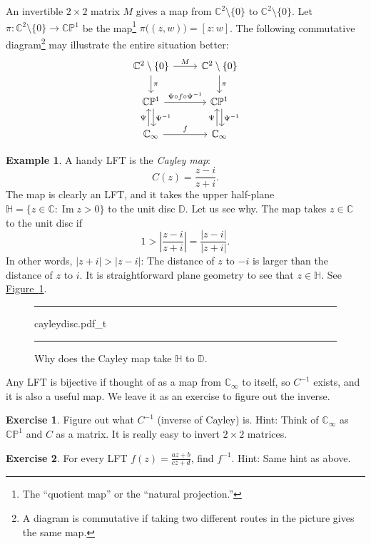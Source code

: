 \documentclass[12pt,openany]{book}
\renewcommand{\Im}{\operatorname{Im}}
\newcommand{\sabs}[1]{\lvert {#1} \rvert}
\newcommand{\abs}[1]{\left\lvert {#1} \right\rvert}
\newcommand{\C}{{\mathbb{C}}}
\newcommand{\D}{{\mathbb{D}}}
\newcommand{\bH}{{\mathbb{H}}}
\newcommand{\bP}{{\mathbb{P}}}
\newcommand{\myindex}[1]{#1\index{#1}}
\newcommand{\myquote}[1]{``#1''}
\theoremstyle{plain}
\theoremstyle{remark}
\theoremstyle{definition}
\newenvironment{exbox}{%
    \def\FrameCommand{\vrule width 1pt \relax\hspace{10pt}}%
    \MakeFramed{\advance\hsize-\width\FrameRestore}%
}{%
    \endMakeFramed
}
\newenvironment{myfig}{%
\begin{figure}[h!t]
\noindent\rule{\textwidth}{0.5pt}\vspace{12pt}\par\centering}%
{\par\noindent\rule{\textwidth}{0.5pt}
\end{figure}}
\theoremstyle{exercise}
\newtheorem{exercise}{Exercise}[section]
\theoremstyle{example}
\newtheorem{example}[thm]{Example}
\newcommand{\figureref}[1]{\hyperref[#1]{Figure~\ref*{#1}}}
\begin{document}
An invertible $2 \times 2$ matrix $M$ gives a map from
$\C^2 \setminus \{ 0 \}$ to $\C^2 \setminus \{ 0 \}$.
Let $\pi \colon \C^2 \setminus \{ 0 \} \to \C \bP^1$ be the map\footnote{The
\myquote{quotient map} or the \myquote{natural projection.}}
$\pi \bigl( (z,w) \bigr) =
[z:w]$.  The following commutative diagram\footnote{A diagram is
commutative if taking two different routes in the picture
gives the same map.}
may
illustrate the entire situation better:
\begin{equation*}
\begin{tikzcd}
\C^2 \setminus \{ 0 \} \arrow[r,"M"] \arrow[d,"\pi"] &
\C^2 \setminus \{ 0 \} \arrow[d,"\pi"] \\
\C \bP^1 \arrow[r,"\Psi \circ f \circ \Psi^{-1}"] \arrow[d,shift left,"\Psi^{-1}"] &
\C \bP^1 \arrow[d,shift left,"\Psi^{-1}"]
\\
\C_\infty \arrow[r,"f"]\arrow[u,shift left,"\Psi"] &
\C_\infty \arrow[u,shift left,"\Psi"]
\end{tikzcd}
\end{equation*}

\begin{example}
A handy LFT is the
\emph{\myindex{Cayley map}}:
\begin{equation*}
C(z)
=
\frac{z - i}{z + i} .
\end{equation*}
The map is clearly an LFT, and it
takes the upper half-plane $\bH = \{ z \in \C : \Im z > 0 \}$ to the
unit disc $\D$.  Let us see why.  The map takes $z \in \C$ to the unit disc if
\begin{equation*}
1 > \abs{\frac{z - i}{z + i} }
=
\frac{\sabs{z - i}}{\sabs{z + i}} .
\end{equation*}
In other words, $\sabs{z+i} > \sabs{z - i}$: The distance of $z$
to $-i$ is larger than the distance of $z$ to $i$.  It is straightforward
plane geometry to see that $z \in \bH$.  See
\figureref{fig:cayleydisc}.
\begin{myfig}
{cayleydisc.pdf_t}
\caption{Why does the Cayley map take $\bH$ to $\D$.\label{fig:cayleydisc}}
\end{myfig}
\end{example}

Any LFT is bijective if thought of as a map from $\C_\infty$
to itself, so $C^{-1}$ exists, and it is also a useful map.  We leave
it as an exercise to figure out the inverse.

\begin{exbox}
\begin{exercise}
Figure out what $C^{-1}$ (inverse of Cayley) is.  Hint: Think of $\C_\infty$ as $\C \bP^1$
and $C$ as a matrix.  It is really easy to invert $2 \times 2$ matrices.
\end{exercise}

\begin{exercise}
For every LFT $f(z) = \frac{az+b}{cz+d}$, find $f^{-1}$.
Hint: Same hint as above.
\end{exercise}
\end{exbox}
\end{document}
